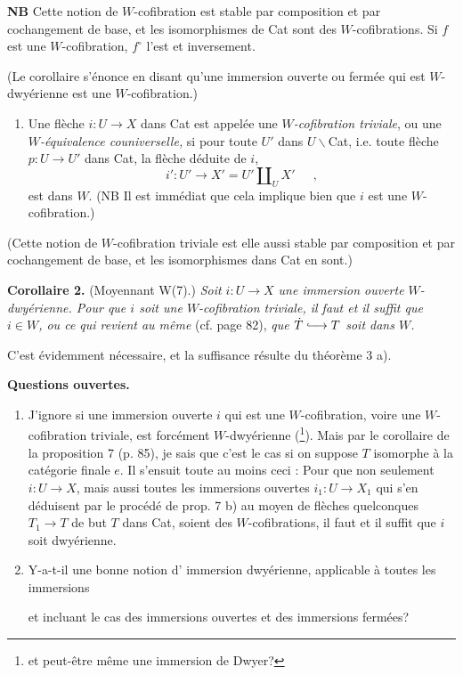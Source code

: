 \documentclass[11pt]{article}
\newcommand{\printedpage}[1]{\marginpar{\footnotesize p.~#1}}
\newcommand{\msp}[1]{\marginpar{\footnotesize [#1]}}
\newcommand{\hra}{\lhook\joinrel\longrightarrow}
\begin{document}
\textbf{NB} Cette notion de $W$-cofibration est stable par composition et par cochangement de base, et les isomorphismes de Cat sont des $W$-cofibrations. Si $f$ est une $W$-cofibration, $f^\circ$ l'est et inversement.

(Le corollaire s'énonce en disant qu'une immersion ouverte ou fermée qui est $W$-dwyérienne est une $W$-cofibration.)

\begin{enumerate}[label=\alph*), start=4]
\item Une flèche $i:U\longrightarrow X$ dans Cat est appelée une \textit{$W$-cofibration triviale}, ou une \textit{$W$-équivalence couniverselle,} si pour toute $U'$ dans $U\backslash$Cat, i.e. toute flèche $p:U\longrightarrow U'$ dans Cat, la flèche déduite de $i$,
\[ i':U'\longrightarrow X'=U'\amalg_U X'\quad\ \ , \]
est dans $W$. (NB Il est immédiat que cela implique bien que $i$ est une $W$-cofibration.)
\end{enumerate}

(Cette notion de $W$-cofibration triviale est elle aussi stable par composition et par cochangement de base, et les isomorphismes dans Cat en sont.)

\msp{page 111}

\textbf{Corollaire 2.} (Moyennant W(7).) \textit{Soit $i:U\longrightarrow X$ une immersion ouverte $W$-dwyérienne. Pour que $i$ soit une $W$-cofibration triviale, il faut et il suffit que $i\in W$, ou ce qui revient au même} (cf. page 82), \textit{que $\dot{T}\hra T$ soit dans $W$.}

C'est évidemment nécessaire, et la suffisance résulte du théorème 3 a).

\textbf{Questions ouvertes.}

\begin{enumerate}[label=\alph*)]
\item J'ignore si une immersion ouverte $i$ qui est une $W$-cofibration, voire une $W$-cofibration triviale, est forcément $W$-dwyérienne (\footnote{et peut-être même une immersion de Dwyer?}). Mais par le corollaire de la proposition 7 (p. 85), je sais que c'est le cas si on suppose $T$ isomorphe à la catégorie finale $e$. Il s'ensuit toute au moins ceci : Pour que non seulement $i:U\longrightarrow X$, mais aussi toutes les immersions ouvertes $i_1:U\longrightarrow X_1$ qui s'en déduisent par le procédé de prop. 7 b) au moyen de flèches quelconques $T_1\longrightarrow T$ de but $T$ dans Cat, soient des $W$-cofibrations, il faut et il suffit que $i$ soit dwyérienne. %

\item \printedpage{77}
Y-a-t-il une bonne notion d' immersion dwyérienne, applicable à toutes les immersions

\msp{page 112}

et incluant le cas des immersions ouvertes et des immersions fermées?
\end{enumerate}
\end{document}
